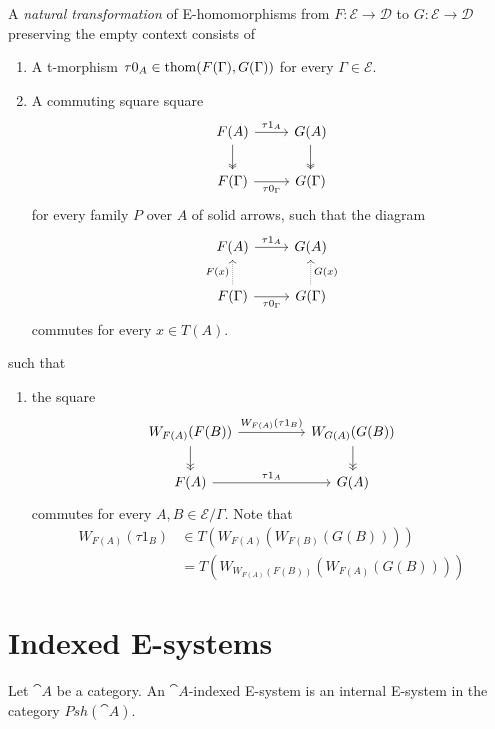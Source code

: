 \begin{defn}
A \emph{natural transformation} of E-homomorphisms from $F:\mathcal{E}\to\mathcal{D}$
to $G:\mathcal{E}\to\mathcal{D}$ preserving the empty context consists of
\begin{enumerate}
\item A t-morphism $\tau0_A\in\mathrm{thom}(F(\Gamma),G(\Gamma))$ for every $\Gamma\in\mathcal{E}$.
\item A commuting square square
\begin{equation*}
\begin{tikzcd}
F(A) \arrow[r,"\tau1_A"] \arrow[d,twoheadrightarrow] & G(A) \arrow[d,twoheadrightarrow] \\
F(\Gamma) \arrow[r,swap,"\tau0_\Gamma"] & G(\Gamma)
\end{tikzcd}
\end{equation*}
for every family $P$ over $A$ of solid arrows, such that the diagram
\begin{equation*}
\begin{tikzcd}
F(A) \arrow[r,"\tau1_A"] & G(A) \\
F(\Gamma) \arrow[r,swap,"\tau0_\Gamma"] \arrow[densely dotted,u,"F(x)"] & G(\Gamma) \arrow[densely dotted,u,swap,"G(x)"]
\end{tikzcd}
\end{equation*}
commutes for every $x\in T(A)$.
\end{enumerate}
such that
\begin{enumerate}
\item the square
\begin{equation*}
\begin{tikzcd}[column sep=huge]
W_{F(A)}(F(B)) \arrow[r,"W_{F(A)}(\tau1_B)"] \arrow[d,->>] & W_{G(A)}(G(B)) \arrow[d,->>] \\
F(A) \arrow[r,"\tau1_A"] & G(A)
\end{tikzcd}
\end{equation*}
commutes for every $A,B\in\mathcal{E}/\Gamma$. Note that 
\begin{align*}
W_{F(A)}(\tau1_B)
  & \in 
T(W_{F(A)}(W_{F(B)}(G(B))))
  \\
  & =
T(W_{W_{F(A)}(F(B))}(W_{F(A)}(G(B))))
\end{align*}
\end{enumerate}
\end{defn}

\section{Indexed E-systems}
\begin{defn}
Let $\cat{A}$ be a category. An $\cat{A}$-indexed E-system is an internal
E-system in the category $Psh(\cat{A})$.
\end{defn}

